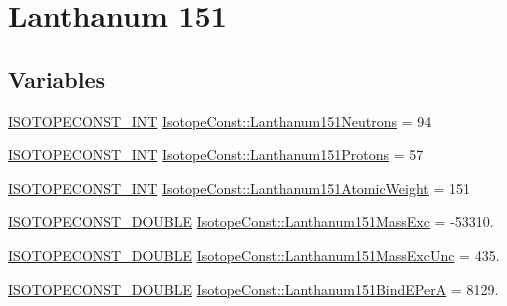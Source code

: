 \hypertarget{group___isotope_const-_lanthanum-_la151}{}\section{Lanthanum 151}
\label{group___isotope_const-_lanthanum-_la151}
\subsection*{Variables}
\begin{DoxyCompactItemize}
\item 
\mbox{\hyperlink{group___isotope_const-_macros_ga5f18360b3e99483a35c32d789e62621c}{I\+S\+O\+T\+O\+P\+E\+C\+O\+N\+S\+T\+\_\+\+I\+NT}} \mbox{\hyperlink{group___isotope_const-_lanthanum-_la151_ga526f610c43291917e8991b9875b5932c}{Isotope\+Const\+::\+Lanthanum151\+Neutrons}} = 94
\item 
\mbox{\hyperlink{group___isotope_const-_macros_ga5f18360b3e99483a35c32d789e62621c}{I\+S\+O\+T\+O\+P\+E\+C\+O\+N\+S\+T\+\_\+\+I\+NT}} \mbox{\hyperlink{group___isotope_const-_lanthanum-_la151_ga40e58505278a04e48347c5656e330904}{Isotope\+Const\+::\+Lanthanum151\+Protons}} = 57
\item 
\mbox{\hyperlink{group___isotope_const-_macros_ga5f18360b3e99483a35c32d789e62621c}{I\+S\+O\+T\+O\+P\+E\+C\+O\+N\+S\+T\+\_\+\+I\+NT}} \mbox{\hyperlink{group___isotope_const-_lanthanum-_la151_ga5906e97916a3336a49549ff36b474e4f}{Isotope\+Const\+::\+Lanthanum151\+Atomic\+Weight}} = 151
\item 
\mbox{\hyperlink{group___isotope_const-_macros_ga8f45a7272ce02c0b4c65c44636ed719a}{I\+S\+O\+T\+O\+P\+E\+C\+O\+N\+S\+T\+\_\+\+D\+O\+U\+B\+LE}} \mbox{\hyperlink{group___isotope_const-_lanthanum-_la151_gaf03a83a4829aba29b71ba195ec607f3c}{Isotope\+Const\+::\+Lanthanum151\+Mass\+Exc}} = -\/53310.
\item 
\mbox{\hyperlink{group___isotope_const-_macros_ga8f45a7272ce02c0b4c65c44636ed719a}{I\+S\+O\+T\+O\+P\+E\+C\+O\+N\+S\+T\+\_\+\+D\+O\+U\+B\+LE}} \mbox{\hyperlink{group___isotope_const-_lanthanum-_la151_ga113faa9eba0d4ab9aae65bd8b0cc8996}{Isotope\+Const\+::\+Lanthanum151\+Mass\+Exc\+Unc}} = 435.
\item 
\mbox{\hyperlink{group___isotope_const-_macros_ga8f45a7272ce02c0b4c65c44636ed719a}{I\+S\+O\+T\+O\+P\+E\+C\+O\+N\+S\+T\+\_\+\+D\+O\+U\+B\+LE}} \mbox{\hyperlink{group___isotope_const-_lanthanum-_la151_ga87a92dab68610bf8c0881ac2890bbd3c}{Isotope\+Const\+::\+Lanthanum151\+Bind\+E\+PerA}} = 8129.
\item 

\end{DoxyCompactItemize}
